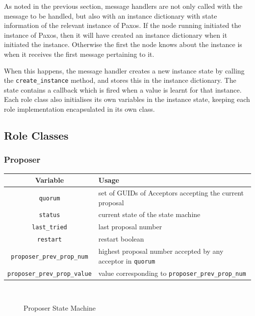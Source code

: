 \documentclass[12pt,twoside,notitlepage]{report}
\newcommand{\lwincludegraphics}[2][]{%
  \sbox{0}{\texttt{[image: \#2]}}%
  \ifdim\wd0>\linewidth
    \resizebox{\linewidth}{!}{\box0 }%
  \else
    \leavevmode\box0
  \fi}
\begin{document}
\label{sec:paxos-instance}

As noted in the previous section, message handlers are not only called with the message to be
handled, but also with an instance dictionary with state information of the relevant instance of
Paxos.  If the node running initiated the instance of Paxos, then it will have created an instance
dictionary when it initiated the instance. Otherwise the first the node knows about the instance
is when it receives the first message pertaining to it.

When this happens, the message handler creates a new instance state by calling the
\verb+create_instance+ method, and stores this in the instance dictionary.  The state contains a
callback which is fired when a value is learnt for that instance. Each role class also initialises
its own variables in the instance state, keeping each role implementation encapsulated in its own
class.

\subsection{Role Classes}

\subsubsection{Proposer}

\begin{tabular}{ | c | p{7cm} | }
  \hline
  {\bf Variable} & {\bf Usage} \\ \hline
  \verb+quorum+ & set of GUIDs of Acceptors accepting the current proposal \\ \hline
  \verb+status+ & current state of the state machine \\ \hline
  \verb+last_tried+ & last proposal number \\ \hline
  \verb+restart+ & restart boolean \\ \hline
  \verb+proposer_prev_prop_num+ & highest proposal number accepted by any acceptor in \verb+quorum+ \\ \hline
  \verb+proposer_prev_prop_value+  & value corresponding to \verb+proposer_prev_prop_num+ \\ \hline
\end{tabular}

~\\

\begin{figure}[htb]
\centering
\lwincludegraphics[scale=0.5]{figs/proposer-state-machine.eps}
\caption{\label{fig:proposer-state-machine}Proposer State Machine}
\end{figure}
\end{document}

